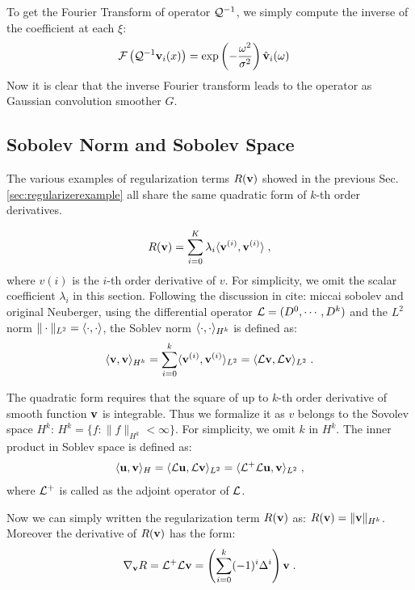 \documentclass[letterpaper,12pt]{article}
\begin{document}
To get the Fourier Transform of operator $\mathcal{Q}^{-1}$, we simply compute the inverse of the coefficient at each $\xi$:
\begin{equation}
\begin{split}
\mathcal{F}\left( \mathcal{Q}^{-1} \mathbf{v}_i(x) \right) 
& =
\exp \left(
- \frac{\omega^2}{\sigma^2}
\right) \hat{\mathbf{v}}_i(\omega)
\end{split}
\end{equation}
Now it is clear that the inverse Fourier transform leads to the operator as Gaussian convolution smoother $G$.

\subsection{Sobolev Norm and Sobolev Space}

The various examples of regularization terms $R(\mathbf{v})$ showed in the previous Sec. \ref{sec:regularizerexample} all share the same quadratic form of $k$-th order derivatives. 

\begin{align}
R(\mathbf{v}) = \sum_{i=0}^K \lambda_i \langle \mathbf{v}^{(i)}, \mathbf{v}^{(i)} \rangle \;,
\end{align}
where $v{(i)}$ is the $i$-th order derivative of $v$. For simplicity, we omit the scalar coefficient $\lambda_i$ in this section. Following the discussion in \cite{Zikic2010} {cite: miccai sobolev and original Neuberger}, using the differential operator $\mathcal{L} = (D^0, \cdots, D^k)$ and the $L^2$ norm $\| \cdot \|_{L^2} = \langle \cdot, \cdot \rangle$, the Soblev norm $\langle \cdot, \cdot \rangle_{H^k}$ is defined as: 
\begin{align}
\langle \mathbf{v}, \mathbf{v} \rangle_{H^k} = \sum_{i=0}^k \langle \mathbf{v}^{(i)}, \mathbf{v}^{(i)} \rangle_{L^2} = \langle \mathcal{L} \mathbf{v}, \mathcal{L} \mathbf{v} \rangle_{L^2} \;.
\end{align}

The quadratic form requires that the square of up to $k$-th order derivative of smooth function $\mathbf{v}$ is integrable. Thus we formalize it as $v$ belongs to the Sovolev space $H^k$:  $H^k = \{ f : \| f \|_{H^k} < \infty \}$. For simplicity, we omit $k$ in $H^k$. The inner product in Soblev space is defined as:
\begin{align}
\langle \mathbf{u}, \mathbf{v} \rangle_H = \langle \mathcal{L}\mathbf{u}, \mathcal{L}\mathbf{v} \rangle_{L^2} = \langle \mathcal{L}^+\mathcal{L} \mathbf{u}, \mathbf{v} \rangle_{L^2} \;,
\end{align}
where $\mathcal{L}^+$ is called as the adjoint operator of $\mathcal{L}$.

Now we can simply written the regularization term $R(\mathbf{v})$ as: $R(\mathbf{v}) = \| \mathbf{v} \|_{H^k}$. Moreover the derivative of $R(\mathbf{v})$ has the form:
\begin{align}
\nabla_{\mathbf{v}} R = \mathcal{L}^+\mathcal{L} \mathbf{v} = \left ( \sum_{i=0}^k (-1)^i \Delta^i \right ) \mathbf{v}\;.
\end{align}
\end{document}
